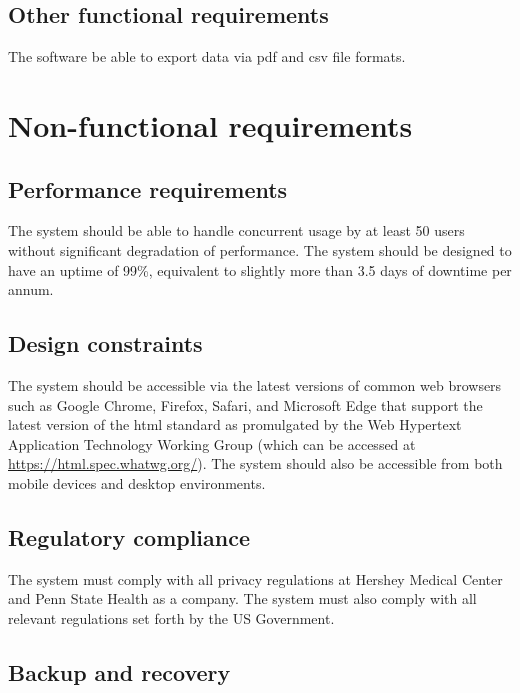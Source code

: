 \documentclass[letterpaper,article,oneside]{memoir}
\begin{document}
\subsection{Other functional requirements}

\begin{requirements}
   The software  be able to export data via \gls{pdf} and \gls{csv} file formats.
\end{requirements}

\section{Non-functional requirements}

\subsection{Performance requirements}
The system should be able to handle concurrent usage by at least 50 users without significant degradation of performance.
The system should be designed to have an uptime of 99\%, equivalent to slightly more than 3.5 days of downtime per annum.

\subsection{Design constraints}

The system should be accessible via the latest versions of common web browsers such as Google Chrome, Firefox, Safari, and Microsoft Edge that support the latest version of the \gls{html} standard as promulgated by the Web Hypertext Application Technology Working Group (which can be accessed at \url{https://html.spec.whatwg.org/}).
The system should also be accessible from both mobile devices and desktop environments.

\subsection{Regulatory compliance}

The system must comply with all privacy regulations at Hershey Medical Center and Penn State Health as a company.
The system must also comply with all relevant regulations set forth by the US Government.

\subsection{Backup and recovery}
\end{document}
